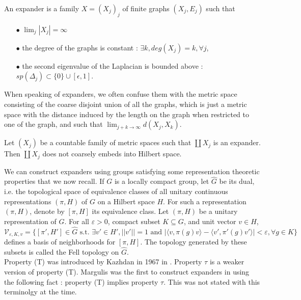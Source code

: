 \begin{definition}
An expander is a family $X=(X_j)_j$ of finite graphs $(X_j,E_j)$ such that 
\begin{itemize}
\item[$\bullet$] $\lim_{j}|X_j|=\infty$
\item[$\bullet$] the degree of the graphs is constant : $\exists k, deg(X_j)=k,\forall j$,
\item[$\bullet$] the second eigenvalue of the Laplacian is bounded above : $sp(\Delta_j)\subset \{0\}\cup [\epsilon,1]$.
\end{itemize}
\end{definition}
When speaking of expanders, we often confuse them with the metric space consisting of the coarse disjoint union of all the graphs, which is just a metric space with the distance induced by the length on the graph when restricted to one of the graph, and such that $\lim_{j+k\rightarrow \infty}d(X_j,X_k)$.

\begin{prop}\cite{NowakYu}
Let $(X_j)$ be a countable family of metric spaces such that $\coprod X_j$ is an expander. Then $\coprod X_j$ does not coarsely embeds into Hilbert space.
\end{prop}

We can construct expanders using groups satisfying some representation theoretic properties that we now recall. If $G$ is a locally compact group, let $\hat G $ be its dual, i.e. the topological space of equivalence classes of all unitary continuous representations $(\pi,H)$ of $G$ on a Hilbert space $H$. For such a representation $(\pi,H)$, denote by $[\pi,H]$ its equivalence class. Let $(\pi,H)$ be a unitary representation of $G$. For all $\varepsilon>0$, compact subset $K\subseteq G$, and unit vector $v\in H$,
\[\mathcal V_{\varepsilon,K,v} = 
		\{ [\pi',H'] \in \hat G\text{ s.t. } \exists v'\in H', ||v'||=1 \text{ and }
		| \langle v,\pi(g)v\rangle - \langle v',\pi'(g)v' \rangle |<\varepsilon , \forall g\in K\}\]
defines a basis of neighborhoods for $[\pi,H]$. The topology generated by these subsets is called the Fell topology on $\hat G$.\\

Property (T) was introduced by Kazhdan in 1967 in \cite{kazhdan}. Property $\tau$ is a weaker version of property (T). Margulis was the first to construct expanders in \cite{MargulisExplicit} using the following fact : property (T) implies property $\tau$. This was not stated with this terminolgy at the time.

